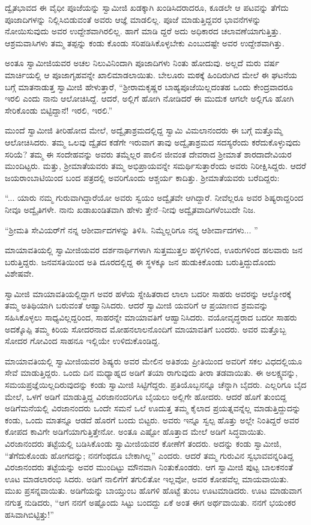 ದ್ವೈತಭಾವದ ಈ ವೈಧೀ ಪೂಜೆಯನ್ನು ಸ್ವಾಮೀಜಿ ಖಡಕ್ಕಾಗಿ ಖಂಡಿಸಿದರಾದರೂ, ಕೂಡಲೇ ಆ ಪಟವನ್ನು ತೆಗೆದು ಪೂಜಾದಿಗಳನ್ನು ನಿಲ್ಲಿಸಿಬಿಡುವಂತೆ ಅವರು ಆಜ್ಞೆ ಮಾಡಲಿಲ್ಲ. ಪೂಜೆ ಮಾಡುತ್ತಿದ್ದವರ ಭಾವನೆಗಳನ್ನು ನೋಯಿಸುವುದು ಅವರ ಉದ್ದೇಶವಾಗಿರಲಿಲ್ಲ. ಹಾಗೆ ಮಾಡಿ ದ್ದರೆ ಅದು ಅಧಿಕಾರದ ಚಲಾವಣೆಯಾಗುತ್ತಿತ್ತು. ಆಶ್ರಮವಾಸಿಗಳು ತಮ್ಮ ತಪ್ಪನ್ನು ಕಂಡು ಕೊಂಡು ಸರಿಪಡಿಸಿಕೊಳ್ಳಬೇಕು ಎಂಬುದಷ್ಟೇ ಅವರ ಉದ್ದೇಶವಾಗಿತ್ತು.

ಅಂತೂ ಸ್ವಾಮೀಜಿಯವರ ಅಚಲ ನಿಲುವಿನಿಂದಾಗಿ ಪೂಜಾದಿಗಳು ನಿಂತು ಹೋದುವು. ಅಲ್ಲದೆ ಮರು ವರ್ಷ ಮಾರ್ಚಿಯಲ್ಲಿ ಆ ಪೂಜಾಗೃಹವನ್ನೇ ಖಾಲಿಮಾಡಲಾಯಿತು. ಬೇಲೂರು ಮಠಕ್ಕೆ ಹಿಂದಿರುಗಿದ ಮೇಲೆ ಈ ಘಟನೆಯ ಬಗ್ಗೆ ಮಾತನಾಡುತ್ತ ಸ್ವಾಮೀಜಿ ಹೇಳುತ್ತಾರೆ, “ಶ್ರೀರಾಮಕೃಷ್ಣರ ಬಾಹ್ಯಪೂಜೆಯಿಲ್ಲದಂತಹ ಒಂದು ಕೇಂದ್ರವಾದರೂ ಇರಲಿ ಎಂದು ನಾನು ಆಲೋಚಿಸಿದ್ದೆ. ಆದರೆ, ಅಲ್ಲಿಗೆ ಹೋಗಿ ನೋಡಿದರೆ ಈ ಮುದುಕ ಆಗಲೇ ಅಲ್ಲಿಗೂ ಹೋಗಿ ಸೇರಿಕೊಂಡು ಬಿಟ್ಟಿದ್ದಾನೆ! ಇರಲಿ, ಇರಲಿ.”

ಮುಂದೆ ಸ್ವಾಮೀಜಿ ತೀರಿಹೋದ ಮೇಲೆ, ಅದ್ವೈತಾಶ್ರಮದಲ್ಲಿದ್ದ ಸ್ವಾಮಿ ವಿಮಲಾನಂದರು ಈ ಬಗ್ಗೆ ಮತ್ತೊಮ್ಮೆ ಆಲೋಚಿಸಿದರು. ತಮ್ಮ ಒಲವು ದ್ವೈತದ ಕಡೆಗೇ ಇರುವಾಗ ತಾವು ಅದ್ವೈತಾಶ್ರಮದ ಸದಸ್ಯರೆಂದು ಕರೆದುಕೊಳ್ಳುವುದು ಸರಿಯೆ? ತಮ್ಮ ಈ ಸಂದೇಹವನ್ನು ಅವರು ತಮ್ಮೆಲ್ಲರ ಪಾಲಿನ ಜೀವಂತ ದೇವರಾದ ಶ್ರೀಮಾತೆ ಶಾರದಾದೇವಿಯರ ಮುಂದಿಟ್ಟರು. ಮತ್ತು, ಶ್ರೀಮಾತೆಯವರು ತಮ್ಮ ಅಭಿಪ್ರಾಯವನ್ನೇ ಸಮರ್ಥಿಸುತ್ತಾರೆಂದು ಅವರು ನಿರೀಕ್ಷಿಸಿದ್ದರು. ಆದರೆ ಜಯರಾಂಬಾಟಿಯಿಂದ ಬಂದ ಪತ್ರದಲ್ಲಿ ಅವರಿಗೊಂದು ಆಶ್ಚರ್ಯ ಕಾದಿತ್ತು. ಶ್ರೀಮಾತೆಯವರು ಬರೆದಿದ್ದರು:

“... ಯಾರು ನಮ್ಮ ಗುರುವಾಗಿದ್ದಾರೆಯೋ ಅವರು ಸ್ವಯಂ ಅದ್ವೈತವೇ ಆಗಿದ್ದಾರೆ. ನೀವೆಲ್ಲರೂ ಅವರ ಶಿಷ್ಯರಾದ್ದರಿಂದ ನೀವೂ ಅದ್ವೈತಿಗಳೇ. ನಾನು ಖಡಾಖಂಡಿತವಾಗಿ ಹೇಳು ತ್ತೇನೆ–ನೀವು ಅದ್ವೈತವಾದಿಗಳೆಂಬುದೇ ನಿಜ.

“ಶ್ರೀಮತಿ ಸೇವಿಯರ್​ಗೆ ನನ್ನ ಆಶೀರ್ವಾದಗಳನ್ನು ತಿಳಿಸಿ. ನಿಮ್ಮೆಲ್ಲರಿಗೂ ನನ್ನ ಆಶೀರ್ವಾದಗಳು... ”

ಮಾಯಾವತಿಯಲ್ಲಿ ಸ್ವಾಮೀಜಿಯವರ ದರ್ಶನಾರ್ಥಿಗಳಾಗಿ ಸುತ್ತಮುತ್ತಲ ಹಳ್ಳಿಗಳಿಂದ, ಊರುಗಳಿಂದ ಹಲವಾರು ಜನ ಬರುತ್ತಿದ್ದರು. ಜನವಸತಿಯಿಂದ ಅತಿ ದೂರದಲ್ಲಿದ್ದ ಈ ಸ್ಥಳಕ್ಕೂ ಜನ ಹುಡುಕಿಕೊಂಡು ಬರುತ್ತಿದ್ದುದೊಂದು ವಿಶೇಷವೇ.

ಸ್ವಾಮೀಜಿ ಮಾಯಾವತಿಯಲ್ಲಿದ್ದಾಗ ಅವರ ಹಳೆಯ ಸ್ನೇಹಿತರಾದ ಲಾಲಾ ಬದರೀ ಸಾಹರು ಅವರನ್ನು ಆಲ್ಮೋರಕ್ಕೆ ತಮ್ಮ ಅತಿಥಿಯಾಗಿ ಬರುವಂತೆ ಆಹ್ವಾನಿಸಿದರು. ಆದರೆ ಸ್ವಾಮೀಜಿ ಯವರಿಗೆ ಆ ಪ್ರಯಾಣದ ಶ್ರಮವನ್ನು ಸಹಿಸಿಕೊಳ್ಳಲು ಸಾಧ್ಯವಿಲ್ಲದ್ದರಿಂದ, ಸಾಹರನ್ನೇ ಮಾಯಾವತಿಗೆ ಆಹ್ವಾನಿಸಿದರು. ವಯೋವೃದ್ಧರಾದ ಬದರೀ ಸಾಹರು ಅದಕ್ಕೊಪ್ಪಿ ತಮ್ಮ ಕಿರಿಯ ಸೋದರನಾದ ಮೋಹನಲಾಲನೊಂದಿಗೆ ಮಾಯಾವತಿಗೆ ಬಂದರು. ಅವರ ಮತ್ತೊಬ್ಬ ಸೋದರ ಗೋವಿಂದ ಸಾಹನೂ ಇಲ್ಲಿಯೇ ಉಳಿದುಕೊಂಡಿದ್ದ.

ಮಾಯಾವತಿಯಲ್ಲಿ ಸ್ವಾಮೀಜಿಯವರ ಶಿಷ್ಯರು ಅವರ ಮೇಲಿನ ಅತಿಶಯ ಪ್ರೀತಿಯಿಂದ ಅವರಿಗೆ ಸಕಲ ವಿಧದಲ್ಲಿಯೂ ಸೇವೆ ಮಾಡುತ್ತಿದ್ದರು. ಒಂದು ದಿನ ಮಧ್ಯಾಹ್ನದ ಅಡಿಗೆ ತಯಾ ರಾಗುವುದು ತೀರಾ ತಡವಾಯಿತು. ಈ ಅಲಕ್ಷ್ಯವನ್ನು, ಸಮಯಪ್ರಜ್ಞೆಯಿಲ್ಲದಿರುವುದನ್ನು ಕಂಡು ಸ್ವಾಮೀಜಿ ಸಿಟ್ಟಿಗೆದ್ದರು. ಪ್ರತಿಯೊಬ್ಬನನ್ನೂ ಚೆನ್ನಾಗಿ ಬೈದರು. ಎಲ್ಲರಿಗೂ ಬೈದ ಮೇಲೆ, ಒಳಗೆ ಅಡಿಗೆ ಮಾಡುತ್ತಿದ್ದ ವಿರಜಾನಂದರಿಗೂ ಬೈಯಲು ಅಲ್ಲಿಗೇ ಹೋದರು. ಆದರೆ ಹೊಗೆ ತುಂಬಿದ್ದ ಅಡಿಗೆಮನೆಯಲ್ಲಿ ವಿರಜಾನಂದರು ಒಂದೇ ಸಮನೆ ಒಲೆ ಊದುತ್ತ ತಮ್ಮ ಕೈಲಾದ ಪ್ರಯತ್ನವನ್ನೆಲ್ಲ ಮಾಡುತ್ತಿದ್ದುದನ್ನು ಕಂಡು, ಒಂದು ಮಾತನ್ನೂ ಆಡದೆ ಹೊರಗೆ ಬಂದು ಬಿಟ್ಟರು. ಅವರು ಇನ್ನೂ ಸ್ವಲ್ಪ ಹೊತ್ತು ಅಲ್ಲೇ ನಿಂತಿದ್ದರೆ ಅವರ ಕೋಪದ ಕಾವಿಗೇ ಅಡಿಗೆಯಾಗುತ್ತಿತ್ತೇನೋ. ಅಂತೂ ಎಷ್ಟೋ ಹೊತ್ತಾದ ಮೇಲೆ ಅಡಿಗೆ ಸಿದ್ಧವಾಯಿತು. ವಿರಜಾನಂದರು ತಟ್ಟೆಯಲ್ಲಿ ಬಡಿಸಿಕೊಂಡು ಸ್ವಾಮೀಜಿಯವರ ಕೋಣೆಗೆ ತಂದರು. ಅದನ್ನು ಕಂಡು ಸ್ವಾಮೀಜಿ, “ತೆಗೆದುಕೊಂಡು ಹೋಗದನ್ನು; ನನಗೆಂಥದೂ ಬೇಕಾಗಿಲ್ಲ” ಎಂದರು. ಆದರೆ ತಮ್ಮ ಗುರುವಿನ ಸ್ವಭಾವವನ್ನರಿತಿದ್ದ ವಿರಜಾನಂದರು ತಟ್ಟೆಯನ್ನು ಅವರ ಮುಂದಿಟ್ಟು ಮೌನವಾಗಿ ನಿಂತುಕೊಂಡರು. ಆಗ ಸ್ವಾಮೀಜಿ ಪುಟ್ಟ ಬಾಲಕನಂತೆ ಊಟ ಮಾಡಲಾರಂಭಿ ಸಿದರು. ಅಡಿಗೆ ನಾಲಿಗೆಗೆ ತಗುಲಿತೋ ಇಲ್ಲವೋ, ಅವರ ಕೋಪವೆಲ್ಲ ಮಾಯವಾಯಿತು. ಮುಖ ಪ್ರಸನ್ನವಾಯಿತು. ಅಡಿಗೆಯನ್ನು ಬಾಯ್ತುಂಬ ಹೊಗಳಿ ಹೊಟ್ಟೆ ತುಂಬ ಊಟಮಾಡಿದರು. ಊಟ ಮಾಡುವಾಗ ನಗುತ್ತ ನುಡಿದರು, “ಆಗ ನನಗೆ ಅಷ್ಟೊಂದು ಸಿಟ್ಟು ಬಂದದ್ದು ಏಕೆ ಅಂತ ಈಗ ಅರ್ಥವಾಯಿತು. ನನಗೆ ಭಯಂಕರ ಹಸಿವಾಗಿಬಿಟ್ಟಿತ್ತು!”

